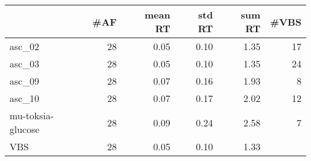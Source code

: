 \begin{tabular}{lrrrrr}
\toprule
 & #AF & mean RT & std RT & sum RT & #VBS \\
\midrule
asc_02 & 28 & 0.05 & 0.10 & 1.35 & 17 \\
asc_03 & 28 & 0.05 & 0.10 & 1.35 & 24 \\
asc_09 & 28 & 0.07 & 0.16 & 1.93 & 8 \\
asc_10 & 28 & 0.07 & 0.17 & 2.02 & 12 \\
mu-toksia-glucose & 28 & 0.09 & 0.24 & 2.58 & 7 \\
VBS & 28 & 0.05 & 0.10 & 1.33 &  \\
\bottomrule
\end{tabular}
